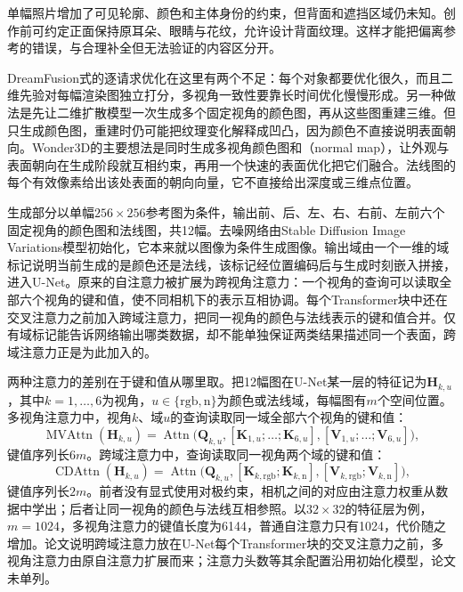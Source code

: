 单幅照片增加了可见轮廓、颜色和主体身份的约束，但背面和遮挡区域仍未知。创作前可约定正面保持原耳朵、眼睛与花纹，允许设计背面纹理。这样才能把偏离参考的错误，与合理补全但无法验证的内容区分开。

DreamFusion式的逐请求优化在这里有两个不足：每个对象都要优化很久，而且二维先验对每幅渲染图独立打分，多视角一致性要靠长时间优化慢慢形成。另一种做法是先让二维扩散模型一次生成多个固定视角的颜色图，再从这些图重建三维。但只生成颜色图，重建时仍可能把纹理变化解释成凹凸，因为颜色不直接说明表面朝向。Wonder3D的主要想法是同时生成多视角颜色图和（normal map），让外观与表面朝向在生成阶段就互相约束，再用一个快速的表面优化把它们融合。法线图的每个有效像素给出该处表面的朝向向量，它不直接给出深度或三维点位置。

生成部分以单幅$256\times256$参考图为条件，输出前、后、左、右、右前、左前六个固定视角的颜色图和法线图，共12幅。去噪网络由Stable Diffusion Image Variations模型初始化，它本来就以图像为条件生成图像。输出域由一个一维的域标记说明当前生成的是颜色还是法线，该标记经位置编码后与生成时刻嵌入拼接，进入U-Net。原来的自注意力被扩展为跨视角注意力：一个视角的查询可以读取全部六个视角的键和值，使不同相机下的表示互相协调。每个Transformer块中还在交叉注意力之前加入跨域注意力，把同一视角的颜色与法线表示的键和值合并。仅有域标记能告诉网络输出哪类数据，却不能单独保证两类结果描述同一个表面，跨域注意力正是为此加入的。

两种注意力的差别在于键和值从哪里取。把12幅图在U-Net某一层的特征记为$\bm H_{k,u}$，其中$k=1,\dots,6$为视角，$u\in\{\mathrm{rgb},\mathrm{n}\}$为颜色或法线域，每幅图有$m$个空间位置。多视角注意力中，视角$k$、域$u$的查询读取同一域全部六个视角的键和值：
\begin{equation}
 \operatorname{MVAttn}(\bm H_{k,u})
 =\operatorname{Attn}\bigl(\bm Q_{k,u},
   [\bm K_{1,u};\dots;\bm K_{6,u}],
   [\bm V_{1,u};\dots;\bm V_{6,u}]\bigr),
 \label{eq:vision-multigen-wonder-mv}
\end{equation}
键值序列长$6m$。跨域注意力中，查询读取同一视角两个域的键和值：
\begin{equation}
 \operatorname{CDAttn}(\bm H_{k,u})
 =\operatorname{Attn}\bigl(\bm Q_{k,u},
   [\bm K_{k,\mathrm{rgb}};\bm K_{k,\mathrm n}],
   [\bm V_{k,\mathrm{rgb}};\bm V_{k,\mathrm n}]\bigr),
 \label{eq:vision-multigen-wonder-cd}
\end{equation}
键值序列长$2m$。前者没有显式使用对极约束，相机之间的对应由注意力权重从数据中学出；后者让同一视角的颜色与法线互相参照。以$32\times32$的特征层为例，$m=1024$，多视角注意力的键值长度为6144，普通自注意力只有1024，代价随之增加。论文说明跨域注意力放在U-Net每个Transformer块的交叉注意力之前，多视角注意力由原自注意力扩展而来；注意力头数等其余配置沿用初始化模型，论文未单列。

